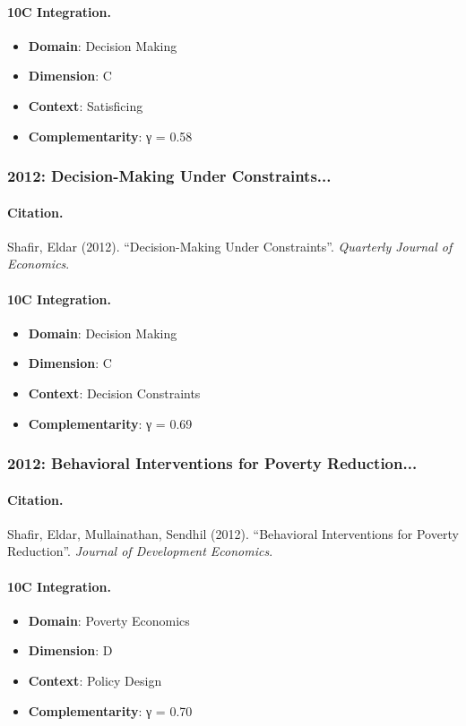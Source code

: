 \paragraph{10C Integration.}
\begin{itemize}[nosep]
  \item \textbf{Domain}: Decision Making
  \item \textbf{Dimension}: C
  \item \textbf{Context}: Satisficing
  \item \textbf{Complementarity}: γ = 0.58
\end{itemize}


\subsubsection{2012: Decision-Making Under Constraints...}

\paragraph{Citation.}
Shafir, Eldar (2012). ``Decision-Making Under Constraints''. \textit{Quarterly Journal of Economics}.

\paragraph{10C Integration.}
\begin{itemize}[nosep]
  \item \textbf{Domain}: Decision Making
  \item \textbf{Dimension}: C
  \item \textbf{Context}: Decision Constraints
  \item \textbf{Complementarity}: γ = 0.69
\end{itemize}


\subsubsection{2012: Behavioral Interventions for Poverty Reduction...}

\paragraph{Citation.}
Shafir, Eldar, Mullainathan, Sendhil (2012). ``Behavioral Interventions for Poverty Reduction''. \textit{Journal of Development Economics}.

\paragraph{10C Integration.}
\begin{itemize}[nosep]
  \item \textbf{Domain}: Poverty Economics
  \item \textbf{Dimension}: D
  \item \textbf{Context}: Policy Design
  \item \textbf{Complementarity}: γ = 0.70
\end{itemize}


